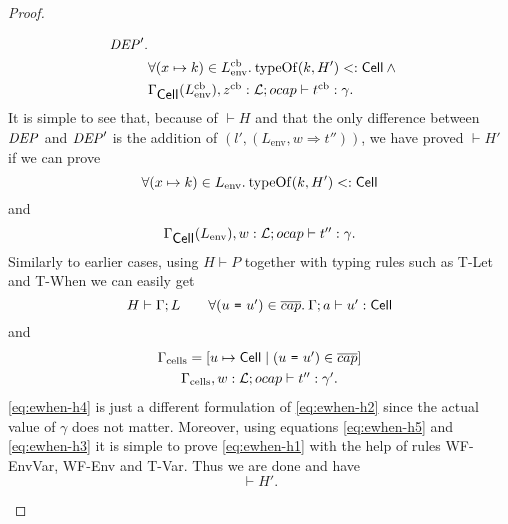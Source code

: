 \begin{proof}
\begin{description}
\begin{description}
\begin{description}
\begin{equation}
\begin{aligned}
                  \mathit{DEP}'. \\
                  &\forall (x \mapsto k) \in L^{\text{cb}}_{\text{env}}.\: \mbox{$\mathrm{typeOf}$}{(k, H')} <:
                  \mbox{$\mathsf{Cell}$} \: \land \\
                  &\mbox{$\Gamma_{\mbox{$\mathsf{Cell}$}{}}(L^{\text{cb}}_{\text{env}}), z^{\text{cb}}:
                  \mbox{$\mathcal{L}$};\mbox{$ocap$}\vdash t^{\text{cb}}:\gamma$} .
                \end{aligned}
              \end{equation}
              It is simple to see that, because of $\vdash H$ and that the only
              difference between $\mathit{DEP}$ and $\mathit{DEP}'$ is the addition of $(l',
              (L_{\text{env}}, w \Rightarrow t''))$, we have proved $\vdash H'$
              if we can prove
              \begin{equation} \label{eq:ewhen-h1}
                \forall (x \mapsto k) \in L_{\text{env}}.\: \mbox{$\mathrm{typeOf}$}{(k, H')} <:
                \mbox{$\mathsf{Cell}$}
              \end{equation}
              and
              \begin{equation} \label{eq:ewhen-h2}
                \mbox{$\Gamma_{\mbox{$\mathsf{Cell}$}{}}(L_{\text{env}}), w:
                \mbox{$\mathcal{L}$};\mbox{$ocap$}\vdash t'':\gamma$}.
              \end{equation}
              Similarly to earlier cases, using $H \vdash P$ together with
              typing rules such as {\sc T-Let} and {\sc T-When} we can easily
              get
              \begin{equation}\label{eq:ewhen-h3}
                H \vdash \Gamma; L \quad\quad \forall (\mbox{\mdseries$u$~\texttt{=}~$u'$}) \in
                \overline{cap}. \: \mbox{$\Gamma;a\vdash u':\mbox{$\mathsf{Cell}$}$} 
              \end{equation}
              and
              \begin{equation} \label{eq:ewhen-h4}
                \begin{gathered}
                  \Gamma_{\text{cells}} = [u \mapsto \mbox{$\mathsf{Cell}$} \mid (\mbox{\mdseries$u$~\texttt{=}~$u'$}) \in
                  \overline{cap}] \\
                  \mbox{$\Gamma_{\text{cells}}, w:
                  \mbox{$\mathcal{L}$};\mbox{$ocap$}\vdash t'':\gamma'$}.
                \end{gathered}
              \end{equation}
              \eqref{eq:ewhen-h4} is just a different formulation of
              \eqref{eq:ewhen-h2} since the actual value of $\gamma$ does not
              matter. Moreover, using equations \eqref{eq:ewhen-h5} and
              \eqref{eq:ewhen-h3} it is simple to prove \eqref{eq:ewhen-h1} with
              the help of rules {\sc WF-EnvVar}, {\sc WF-Env} and {\sc T-Var}.
              Thus we are done and have
              \begin{equation}
                \vdash H'.
              \end{equation}


\end{description}
\end{description}
\end{description}
\end{proof}
